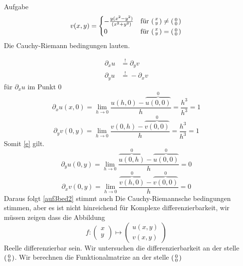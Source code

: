 \documentclass{scrartcl}
\begin{document}
\begin{section}{Aufgabe}
\[v(x,y)=\begin{cases} 
-\frac{y(x^2 - y^2)}{(x^2+y^2)} & \text{für } 
     \begin{psmallmatrix}x \\y \end{psmallmatrix}
     \neq 
     \begin{psmallmatrix}0\\0 \end{psmallmatrix}
      \\
 0 & \text{für } 
     \begin{psmallmatrix}x \\y \end{psmallmatrix}
     =
     \begin{psmallmatrix}0\\0 \end{psmallmatrix}
     \\
   \end{cases}\]
Die Cauchy-Riemann bedingungen lauten.
\end{section}
\begin{align}
\partial_x u &\overset{!}{=} \partial_y v \label{e}\\ 
\partial_y u &\overset{!}{=} - \partial_x v \label{auf3bed2}
\end{align}
für \(\partial_x u\) im Punkt 0
\[\partial_x u(x,0)=\lim_{h\rightarrow 0}\frac{u(h,0)-\overbrace{u(0,0)}^{0}}{h}=\frac{h^3}{h^3}=1\]
\[\partial_y v(0,y)=\lim_{h\rightarrow 0}\frac{v(0,h)-\overbrace{v(0,0)}^{0}}{h}=\frac{h^3}{h^3}=1\]
Somit \eqref{e} gilt.
\[\partial_y u(0,y)=\lim_{h\rightarrow 0}\frac{\overbrace{u(0,h)}^0-\overbrace{u(0,0)}^{0}}{h}=0\]
\[\partial_x v(0,y)=\lim_{h\rightarrow 0}\frac{\overbrace{v(h,0)}^0-\overbrace{v(0,0)}^{0}}{h}=0\]
Daraus folgt \eqref{auf3bed2} stimmt auch
Die Cauchy-Riemannsche bedingungen stimmen, aber es ist nicht hinreichend für Komplexe differenzierbarkeit, wir müssen zeigen dass die Abbildung
\[f:\begin{pmatrix}x \\y \end{pmatrix}\mapsto \begin{pmatrix}u(x,y) \\v(x,y) \end{pmatrix}\]
Reelle differenzierbar sein.
Wir untersuchen die differenzierbarkeit an der stelle \(\begin{psmallmatrix}0\\0\end{psmallmatrix}\).
Wir berechnen die Funktionalmatrize an der stelle \(\begin{psmallmatrix}0\\0\end{psmallmatrix}\)
\end{document}
